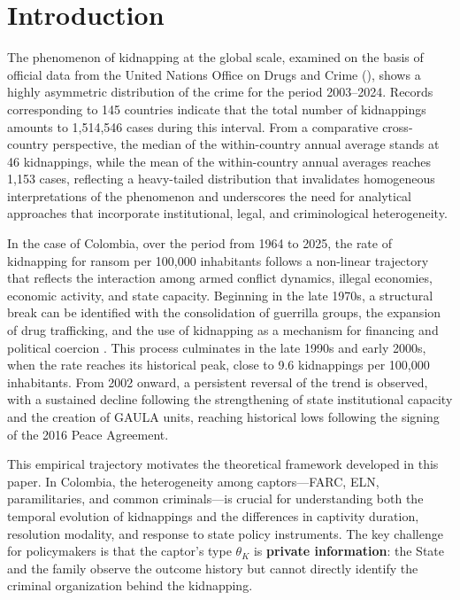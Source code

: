 \documentclass[12pt]{article}
\theoremstyle{definition}
\theoremstyle{remark}
\newcommand{\1}{\mathbf{1}}
\begin{document}
\newpage
\setcounter{page}{1}

\section{Introduction}
\label{sec:introduction}

\noindent The phenomenon of kidnapping at the global scale, examined on the basis of official data from the United Nations Office on Drugs and Crime (\textcite{unodc_Data}), shows a highly asymmetric distribution of the crime for the period 2003--2024. Records corresponding to 145 countries indicate that the total number of kidnappings amounts to 1,514,546 cases during this interval. From a comparative cross-country perspective, the median of the within-country annual average stands at 46 kidnappings, while the mean of the within-country annual averages reaches 1,153 cases, reflecting a heavy-tailed distribution that invalidates homogeneous interpretations of the phenomenon and underscores the need for analytical approaches that incorporate institutional, legal, and criminological heterogeneity.

In the case of Colombia, over the period from 1964 to 2025, the rate of kidnapping for ransom per 100,000 inhabitants follows a non-linear trajectory that reflects the interaction among armed conflict dynamics, illegal economies, economic activity, and state capacity. Beginning in the late 1970s, a structural break can be identified with the consolidation of guerrilla groups, the expansion of drug trafficking, and the use of kidnapping as a mechanism for financing and political coercion \parencite{pinto2004,Zarate2007}. This process culminates in the late 1990s and early 2000s, when the rate reaches its historical peak, close to 9.6 kidnappings per 100,000 inhabitants. From 2002 onward, a persistent reversal of the trend is observed, with a sustained decline following the strengthening of state institutional capacity and the creation of GAULA units, reaching historical lows following the signing of the 2016 Peace Agreement.

This empirical trajectory motivates the theoretical framework developed in this paper. In Colombia, the heterogeneity among captors---FARC, ELN, paramilitaries, and common criminals---is crucial for understanding both the temporal evolution of kidnappings and the differences in captivity duration, resolution modality, and response to state policy instruments. The key challenge for policymakers is that the captor's type $\theta_K$ is \textbf{private information}: the State and the family observe the outcome history but cannot directly identify the criminal organization behind the kidnapping.
\end{document}
